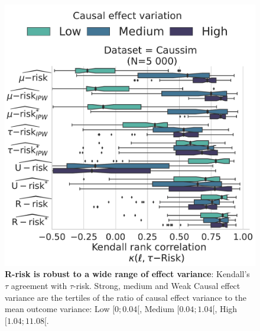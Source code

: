 \documentclass[a4paper,num-refs]{oup-contemporary}%
\begin{document}
\begin{figure}[!tb]
    \centering
    \begin{minipage}{\linewidth}
        \includegraphics[width=0.9\linewidth]{_6_effect_variance_by_bin_comparaison_kendall_by_Dataset.pdf}
    \end{minipage}

    \caption{\textbf{R-risk is robust to a wide range of effect variance}:
    Kendall's $\tau$ agreement with $\tau$-risk. Strong, medium and Weak Causal
    effect variance are the tertiles of the ratio of causal effect variance to
    the mean outcome variance: Low $[0;0.04[$, Medium $[0.04; 1.04[$,
    High $[1.04;11.08[$.}\label{fig:effect_variance_influence}
\end{figure}

\begin{table}[!ht]
    \centering
    \caption{Statistical summary of the causal effect variance.}
    \label{table:effect_variance}
\end{table}

\pagebreak


\end{document}
